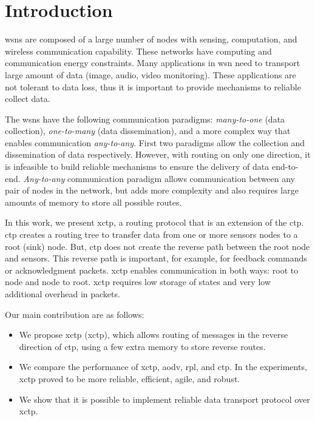 \section{Introduction}
\label{sec:introduction}


\acp{wsn} are composed of a large number of nodes with sensing, computation, and wireless communication capability. These networks have computing and communication energy constraints. Many applications in \ac{wsn} need to transport large amount of data (image, audio, video monitoring). These applications are not tolerant to data loss, thus it is important to provide mechanisms to reliable collect data.

The \acp{wsn} have the following communication paradigms: \textit{many-to-one} (data collection), \textit{one-to-many} (data dissemination), and a more complex way that enables communication \textit{any-to-any}. First two paradigms allow the collection and dissemination of data respectively. However, with routing on only one direction, it is infeasible to build reliable mechanisms to ensure the delivery of data end-to-end. \textit{Any-to-any} communication paradigm allows communication between any pair of nodes in the network, but adds more complexity and also requires large amounts of memory to store all possible routes.

In this work, we present \acf{xctp}, a routing protocol that is an extension of the \ac{ctp}. \ac{ctp} creates a routing tree to transfer data from one or more sensors nodes to a root (sink) node. But, \ac{ctp} does not create the reverse path between the root node and sensors. This reverse path is important, for example, for feedback commands or acknowledgment packets. \ac{xctp} enables communication in both ways: root to node and node to root. \ac{xctp} requires low storage of states and very low additional overhead in packets.

Our main contribution are as follows:
\begin{itemize}
     \item We propose \acl{xctp} (\ac{xctp}), which allows routing of messages in the reverse direction of \ac{ctp}, using a few extra memory to store reverse routes.
     \item We compare the performance of \ac{xctp}, \ac{aodv}, \ac{rpl}, and \ac{ctp}. In the experiments, \ac{xctp} proved to be more reliable, efficient, agile, and robust.
     \item We show that it is possible to implement reliable data transport protocol over \ac{xctp}.
\end{itemize}


